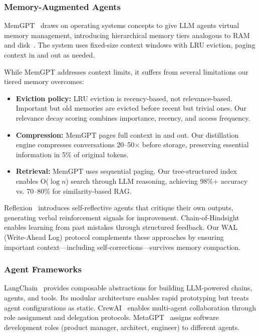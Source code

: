 \documentclass{article}
\begin{document}
\subsubsection{Memory-Augmented Agents}

MemGPT~\cite{packer2023memgpt} draws on operating systems concepts to give LLM agents virtual memory management, introducing hierarchical memory tiers analogous to RAM and disk~\cite{silberschatz2014operating}. The system uses fixed-size context windows with LRU eviction, paging context in and out as needed.

While MemGPT addresses context limits, it suffers from several limitations our tiered memory overcomes:

\begin{itemize}[leftmargin=*]
    \item \textbf{Eviction policy:} LRU eviction is recency-based, not relevance-based. Important but old memories are evicted before recent but trivial ones. Our relevance decay scoring combines importance, recency, and access frequency.
    
    \item \textbf{Compression:} MemGPT pages full context in and out. Our distillation engine compresses conversations 20--50$\times$ before storage, preserving essential information in 5\% of original tokens.
    
    \item \textbf{Retrieval:} MemGPT uses sequential paging. Our tree-structured index enables O($\log n$) search through LLM reasoning, achieving 98\%+ accuracy vs. 70--80\% for similarity-based RAG.
\end{itemize}

Reflexion~\cite{shinn2024reflexion} introduces self-reflective agents that critique their own outputs, generating verbal reinforcement signals for improvement. Chain-of-Hindsight~\cite{liu2023chain} enables learning from past mistakes through structured feedback. Our WAL (Write-Ahead Log) protocol complements these approaches by ensuring important context—including self-corrections—survives memory compaction.

\subsubsection{Agent Frameworks}

LangChain~\cite{langchain} provides composable abstractions for building LLM-powered chains, agents, and tools. Its modular architecture enables rapid prototyping but treats agent configurations as static. CrewAI~\cite{crewai} enables multi-agent collaboration through role assignment and delegation protocols. MetaGPT~\cite{ge2023metagpt} assigns software development roles (product manager, architect, engineer) to different agents.
\end{document}
